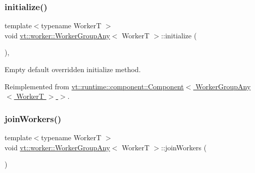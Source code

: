 \mbox{\label{structvt_1_1worker_1_1_worker_group_any_ad8bb855b98bf26337ca13df2bff5fb95}} 
\subsubsection{\texorpdfstring{initialize()}{initialize()}}
{\footnotesize\ttfamily template$<$typename WorkerT $>$ \\
void \hyperlink{structvt_1_1worker_1_1_worker_group_any}{vt\+::worker\+::\+Worker\+Group\+Any}$<$ WorkerT $>$\+::initialize (\begin{DoxyParamCaption}{ }\end{DoxyParamCaption})\hspace{0.3cm}{\ttfamily [override]}, {\ttfamily [virtual]}}



Empty default overridden initialize method. 



Reimplemented from \hyperlink{structvt_1_1runtime_1_1component_1_1_component_a7f07384d294e59796add9ce6be2d6410}{vt\+::runtime\+::component\+::\+Component$<$ Worker\+Group\+Any$<$ Worker\+T $>$ $>$}.

\mbox{\label{structvt_1_1worker_1_1_worker_group_any_ac0e40c916ea7620e2985ed29f66a5701}} 
\subsubsection{\texorpdfstring{join\+Workers()}{joinWorkers()}}
{\footnotesize\ttfamily template$<$typename WorkerT $>$ \\
void \hyperlink{structvt_1_1worker_1_1_worker_group_any}{vt\+::worker\+::\+Worker\+Group\+Any}$<$ WorkerT $>$\+::join\+Workers (\begin{DoxyParamCaption}{ }\end{DoxyParamCaption})}

\mbox{\label{structvt_1_1worker_1_1_worker_group_any_a29dc03c300f442508501671d9ec1eecd}} 
